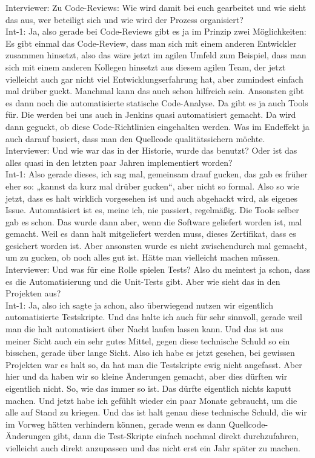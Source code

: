 Interviewer: Zu Code-Reviews: Wie wird damit bei euch gearbeitet und wie sieht das aus, wer beteiligt sich und wie wird der Prozess organisiert?\\
Int-1: Ja, also gerade bei Code-Reviews gibt es ja im Prinzip zwei Möglichkeiten: Es gibt einmal das Code-Review, dass man sich mit einem anderen Entwickler zusammen hinsetzt, also das wäre jetzt im agilen Umfeld zum Beispiel, dass man sich mit einem anderen Kollegen hinsetzt aus diesem agilen Team, der jetzt vielleicht auch gar nicht viel Entwicklungserfahrung hat, aber zumindest einfach mal drüber guckt. Manchmal kann das auch schon hilfreich sein. Ansonsten gibt es dann noch die automatisierte statische Code-Analyse. Da gibt es ja auch Tools für. Die werden bei uns auch in Jenkins quasi automatisiert gemacht. Da wird dann geguckt, ob diese Code-Richtlinien eingehalten werden. Was im Endeffekt ja auch darauf basiert, dass man den Quellcode qualitätssichern möchte.\\
Interviewer: Und wie war das in der Historie, wurde das benutzt? Oder ist das alles quasi in den letzten paar Jahren implementiert worden?\\
Int-1: Also gerade dieses, ich sag mal, gemeinsam drauf gucken, das gab es früher eher so: „kannst da kurz mal drüber gucken“, aber nicht so formal. Also so wie jetzt, dass es halt wirklich vorgesehen ist und auch abgehackt wird, als eigenes Issue. Automatisiert ist es, meine ich, nie passiert, regelmäßig. Die Tools selber gab es schon. Das wurde dann aber, wenn die Software geliefert worden ist, mal gemacht. Weil es dann halt mitgeliefert werden muss, dieses Zertifikat, dass es gesichert worden ist. Aber ansonsten wurde es nicht zwischendurch mal gemacht, um zu gucken, ob noch alles gut ist. Hätte man vielleicht machen müssen.\\
Interviewer: Und was für eine Rolle spielen Tests? Also du meintest ja schon, dass es die Automatisierung und die Unit-Tests gibt. Aber wie sieht das in den Projekten aus?\\
Int-1: Ja, also ich sagte ja schon, also überwiegend nutzen wir eigentlich automatisierte Testskripte. Und das halte ich auch für sehr sinnvoll, gerade weil man die halt automatisiert über Nacht laufen lassen kann. Und das ist aus meiner Sicht auch ein sehr gutes Mittel, gegen diese technische Schuld so ein bisschen, gerade über lange Sicht. Also ich habe es jetzt gesehen, bei gewissen Projekten war es halt so, da hat man die Testskripte ewig nicht angefasst. Aber hier und da haben wir so kleine Änderungen gemacht, aber dies dürften wir eigentlich nicht. So, wie das immer so ist. Das dürfte eigentlich nichts kaputt machen. Und jetzt habe ich gefühlt wieder ein paar Monate gebraucht, um die alle auf Stand zu kriegen. Und das ist halt genau diese technische Schuld, die wir im Vorweg hätten verhindern können, gerade wenn es dann Quellcode-Änderungen gibt, dann die Test-Skripte einfach nochmal direkt durchzufahren, vielleicht auch direkt anzupassen und das nicht erst ein Jahr später zu machen.\\
